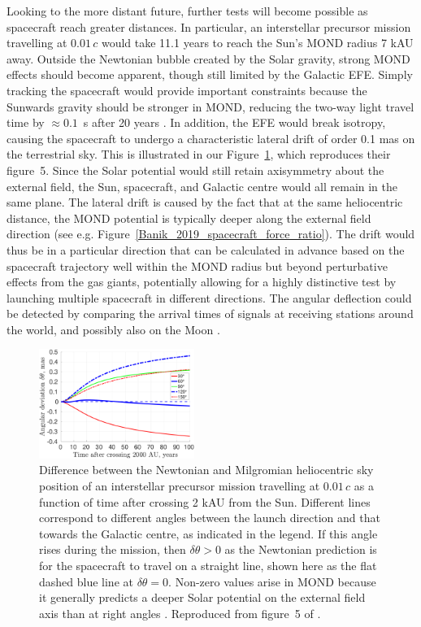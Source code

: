 \documentclass[fleqn,usenatbib,useAMS]{mnras} %
\begin{document}
Looking to the more distant future, further tests will become possible as spacecraft reach greater distances. In particular, an interstellar precursor mission travelling at $0.01\,c$ would take 11.1 years to reach the Sun's MOND radius 7 kAU away. Outside the Newtonian bubble created by the Solar gravity, strong MOND effects should become apparent, though still limited by the Galactic EFE. Simply tracking the spacecraft would provide important constraints because the Sunwards gravity should be stronger in MOND, reducing the two-way light travel time by $\approx 0.1$~s after 20 years \citep{Banik_2019_spacecraft}. In addition, the EFE would break isotropy, causing the spacecraft to undergo a characteristic lateral drift of order 0.1 mas on the terrestrial sky. This is illustrated in our Figure~\ref{Banik_2019_spacecraft_angle_time}, which reproduces their figure~5. Since the Solar potential would still retain axisymmetry about the external field, the Sun, spacecraft, and Galactic centre would all remain in the same plane. The lateral drift is caused by the fact that at the same heliocentric distance, the MOND potential is typically deeper along the external field direction (see e.g. Figure~\ref{Banik_2019_spacecraft_force_ratio}). The drift would thus be in a particular direction that can be calculated in advance based on the spacecraft trajectory well within the MOND radius but beyond perturbative effects from the gas giants, potentially allowing for a highly distinctive test by launching multiple spacecraft in different directions. The angular deflection could be detected by comparing the arrival times of signals at receiving stations around the world, and possibly also on the Moon \citep{Kurdubov_2019}.

\begin{figure}
	\centering
	\includegraphics[width=0.45\textwidth]{Banik_2019_spacecraft_Figure_5}
	\caption{Difference between the Newtonian and Milgromian heliocentric sky position of an interstellar precursor mission travelling at $0.01\,c$ as a function of time after crossing 2 kAU from the Sun. Different lines correspond to different angles between the launch direction and that towards the Galactic centre, as indicated in the legend. If this angle rises during the mission, then $\delta \theta > 0$ as the Newtonian prediction is for the spacecraft to travel on a straight line, shown here as the flat dashed blue line at $\delta \theta = 0$. Non-zero values arise in MOND because it generally predicts a deeper Solar potential on the external field axis than at right angles \citep[Equation~\ref{Point_mass_EFE_QUMOND}, see also][]{Banik_2018_EFE}. Reproduced from figure~5 of \citet{Banik_2019_spacecraft}.}
	\label{Banik_2019_spacecraft_angle_time}
\end{figure}
\end{document}
